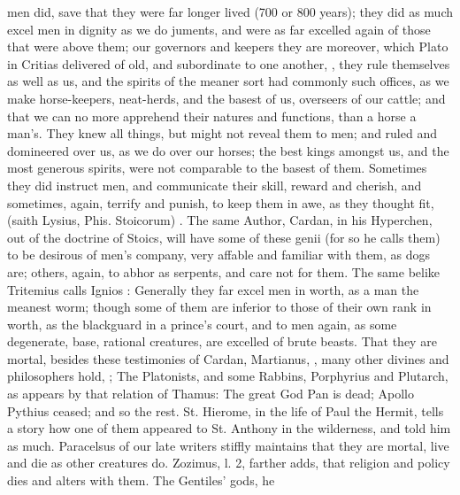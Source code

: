 {{men did, save that they were far longer lived (700 or 800 years);
they did as much excel men in dignity as we do juments, and were as far
excelled again of those that were above them; our governors and
keepers they are moreover, which Plato in Critias delivered of
old, and subordinate to one another, , they rule themselves as well as us, and the spirits
of the meaner sort had commonly such offices, as we make horse-keepers,
neat-herds, and the basest of us, overseers of our cattle; and that we
can no more apprehend their natures and functions, than a horse a
man's. They knew all things, but might not reveal them to men; and
ruled and domineered over us, as we do over our horses; the best kings
amongst us, and the most generous spirits, were not comparable to the
basest of them. Sometimes they did instruct men, and communicate their
skill, reward and cherish, and sometimes, again, terrify and punish, to
keep them in awe, as they thought fit,  (saith
Lysius, Phis. Stoicorum) . The same
Author, Cardan, in his Hyperchen, out of the doctrine of Stoics, will
have some of these genii (for so he calls them) to be desirous of
men's company, very affable and familiar with them, as dogs are;
others, again, to abhor as serpents, and care not for them. The same
belike Tritemius calls Ignios : Generally
they far excel men in worth, as a man the meanest worm; though some of
them are inferior to those of their own rank in worth, as the
blackguard in a prince's court, and to men again, as some degenerate,
base, rational creatures, are excelled of brute beasts.
That they are mortal, besides these testimonies of Cardan, Martianus,
\etc{}, many other divines and philosophers hold, ; The Platonists, and some Rabbins, Porphyrius and
Plutarch, as appears by that relation of Thamus: The great God
Pan is dead; Apollo Pythius ceased; and so the rest. St. Hierome, in
the life of Paul the Hermit, tells a story how one of them appeared to
St. Anthony in the wilderness, and told him as much. Paracelsus
of our late writers stiffly maintains that they are mortal, live and
die as other creatures do. Zozimus, l. 2, farther adds, that religion
and policy dies and alters with them. The Gentiles' gods, he
}}
